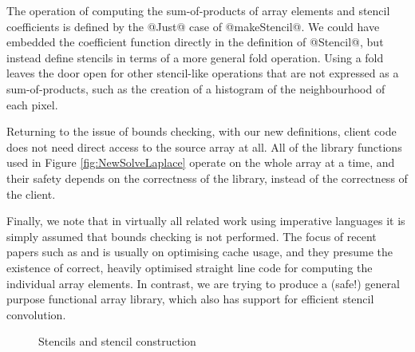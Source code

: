 The operation of computing the sum-of-products of array elements and stencil coefficients is defined by the @Just@ case of @makeStencil@. We could have embedded the coefficient function directly in the definition of @Stencil@, but instead define stencils in terms of a more general fold operation. Using a fold leaves the door open for other stencil-like operations that are not expressed as a sum-of-products, such as the creation of a histogram of the neighbourhood of each pixel.

Returning to the issue of bounds checking, with our new definitions, client code does not need direct access to the source array at all. All of the library functions used in Figure \ref{fig:NewSolveLaplace} operate on the whole array at a time, and their safety depends on the correctness of the library, instead of the correctness of the client.

Finally, we note that in virtually all related work using imperative languages it is simply assumed that bounds checking is not performed. The focus of recent papers such as \cite{Datta:stencil-computation-autotuning} and \cite{Krishnamoorthy:auto-paralellization-of-stencils} is usually on optimising cache usage, and they presume the existence of correct, heavily optimised straight line code for computing the individual array elements. In contrast, we are trying to produce a (safe!) general purpose functional array library, which also has support for efficient stencil convolution. 

\begin{figure}
\begin{small}
\end{small}
\caption{Stencils and stencil construction}
\label{fig:Stencils}
\end{figure}


